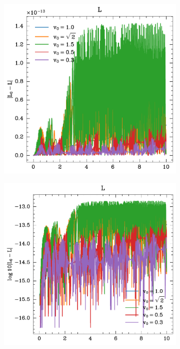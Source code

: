 \begin{figure}
\begin{subfigure}{0.49\textwidth}
    \end{subfigure}
    \newline
    \begin{subfigure}{0.49\textwidth}
        \includegraphics[width=\textwidth]{../images/1-1-L_lin.pdf}
    \end{subfigure}
    \hfill
    \begin{subfigure}{0.49\textwidth}
        \includegraphics[width=\textwidth]{../images/1-1-L_log.pdf}
    \end{subfigure}
    \newline


\end{figure}
